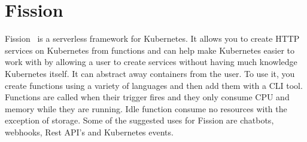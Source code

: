 \section{Fission}
Fission~\cite{hid-sp18-521-FissionBlog} is a serverless framework for
Kubernetes. It allows you to create HTTP services on Kubernetes from
functions and can help make Kubernetes easier to work with by
allowing a user to create services without having much knowledge
Kubernetes itself. It can abstract away containers from the user. 
To use it, you create functions using a variety of languages and then
add them with a CLI tool. Functions are called when their trigger fires and 
they only consume CPU and memory while they are running. Idle function 
consume no resources with the exception of storage. Some of the suggested
uses for Fission are chatbots, webhooks, Rest API's and Kubernetes events.
